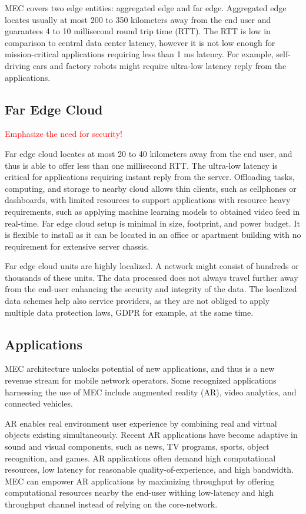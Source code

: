 MEC covers two edge entities: aggregated edge and far edge. Aggregated edge locates usually at most 200 to 350 kilometers away from the end user and guarantees 4 to 10 millisecond round trip time (RTT). The RTT is low in comparison to central data center latency, however it is not low enough for mission-critical applications requiring less than 1 ms latency. For example, self-driving cars and factory robots might require ultra-low latency reply from the applications.

\subsection{Far Edge Cloud}

\textcolor{red}{Emphasize the need for security!}

Far edge cloud locates at most 20 to 40 kilometers away from the end user, and thus is able to offer less than one millisecond RTT. The ultra-low latency is critical for applications requiring instant reply from the server. Offloading tasks, computing, and storage to nearby cloud allows thin clients, such as cellphones or dashboards, with limited resources to support applications with resource heavy requirements, such as applying machine learning models to obtained video feed in real-time. Far edge cloud setup is minimal in size, footprint, and power budget. It is flexible to install as it can be located in an office or apartment building with no requirement for extensive server chassis. \cite{AirFrameOpenEdgeServer}

Far edge cloud units are highly localized. A network might consist of hundreds or thousands of these units. The data processed does not always travel further away from the end-user enhancing the security and integrity of the data. The localized data schemes help also service providers, as they are not obliged to apply multiple data protection laws, GDPR for example, at the same time. 

\subsection{Applications}

MEC architecture unlocks potential of new applications, and thus is a new revenue stream for mobile network operators. Some recognized applications harnessing the use of MEC include augmented reality (AR), video analytics, and connected vehicles.

AR enables real environment user experience by combining real and virtual objects existing simultaneously. Recent AR applications have become adaptive in sound and visual components, such as news, TV programs, sports, object recognition, and games. AR applications often demand high computational resources, low latency for reasonable quality-of-experience, and high bandwidth. MEC can empower AR applications by maximizing throughput by offering computational resources nearby the end-user withing low-latency and high throughput channel instead of relying on the core-network. \cite{Abbas2018}

